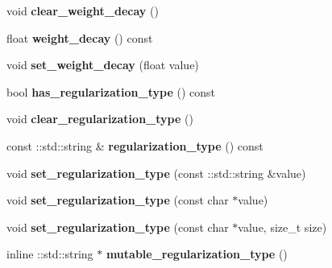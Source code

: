 \begin{DoxyCompactItemize}
void {\bfseries clear\+\_\+weight\+\_\+decay} ()
\item 
\mbox{\label{classcaffe_1_1_solver_parameter_af3fa9725738e88ff68df9037eb60f17d}} 
float {\bfseries weight\+\_\+decay} () const
\item 
\mbox{\label{classcaffe_1_1_solver_parameter_ad69f845b1c69a8773f45c84cf28981d4}} 
void {\bfseries set\+\_\+weight\+\_\+decay} (float value)
\item 
\mbox{\label{classcaffe_1_1_solver_parameter_a4f756d6d7bfc47191ae8c55c0fd57355}} 
bool {\bfseries has\+\_\+regularization\+\_\+type} () const
\item 
\mbox{\label{classcaffe_1_1_solver_parameter_a17397a1cf22044ccac398c99479ebe4f}} 
void {\bfseries clear\+\_\+regularization\+\_\+type} ()
\item 
\mbox{\label{classcaffe_1_1_solver_parameter_a5b659c67e7f0cf2284bc09b919843aa6}} 
const \+::std\+::string \& {\bfseries regularization\+\_\+type} () const
\item 
\mbox{\label{classcaffe_1_1_solver_parameter_ac57efc981ddbd0f51a072210e581cabf}} 
void {\bfseries set\+\_\+regularization\+\_\+type} (const \+::std\+::string \&value)
\item 
\mbox{\label{classcaffe_1_1_solver_parameter_a5c0057176d7757d7fd65a9529df3872e}} 
void {\bfseries set\+\_\+regularization\+\_\+type} (const char $\ast$value)
\item 
\mbox{\label{classcaffe_1_1_solver_parameter_ab7fa9e90219cfb54415c6553f4c7e87e}} 
void {\bfseries set\+\_\+regularization\+\_\+type} (const char $\ast$value, size\+\_\+t size)
\item 
\mbox{\label{classcaffe_1_1_solver_parameter_a8bb8a58f59e51b19bd424f7d4d6e3378}} 
inline \+::std\+::string $\ast$ {\bfseries mutable\+\_\+regularization\+\_\+type} ()
\item 

\end{DoxyCompactItemize}
